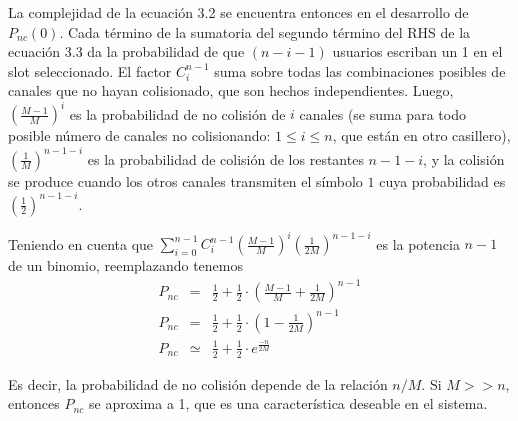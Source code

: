 La complejidad de la ecuación 3.2 se encuentra entonces en el desarrollo de $P_{nc}(0)$. Cada término de la sumatoria del segundo término del RHS de la ecuación 3.3 da la probabilidad de que $(n-i-1)$ usuarios escriban un 1 en el slot seleccionado.
El factor $C^{n-1}_{i}$ suma sobre todas las combinaciones posibles de canales que no hayan colisionado, que son hechos independientes.
\noindent Luego, $\left(\frac{M-1}{M}\right)^i$ es la probabilidad de no colisión de $i$ canales (se suma para todo posible número de canales no
colisionando: $1\leq i\leq n$, que están en otro casillero), $
\left(\frac{1}{M}\right)^{n-1-i}$ es la probabilidad de colisión de los restantes
$n-1-i$, y la colisión se produce cuando los otros canales
transmiten el símbolo $1$ cuya probabilidad es $\left(\frac{1}{2}\right)^{n-1-i}$.



\noindent Teniendo en cuenta que $ \sum_{i=0}^{n-1}
C^{n-1}_{i} \left(\frac{M-1}{M}\right)^i  \left(\frac{1}{2M}\right)^{n-1-i}$ es la potencia $n-1$ de un binomio, reemplazando tenemos
\begin{eqnarray}
P_{nc} & = & \frac{1}{2} +  \frac{1}{2} \cdot \left(\frac{M-1}{M} + \frac{1}{2M} \right)^{n-1} \\
P_{nc} & = & \frac{1}{2} +  \frac{1}{2} \cdot \left(1- \frac{1}{2M} \right)^{n-1} \\
P_{nc} & \simeq & \frac{1}{2} +  \frac{1}{2} \cdot e^{\frac{-n}{2M}}
\end{eqnarray}



Es decir, la probabilidad de no colisión depende de la relación $n/M$. Si $M>>n$, entonces $P_{nc}$ se aproxima a 1, que es una característica deseable en el sistema.
\iffalse

\vspace{5mm}

